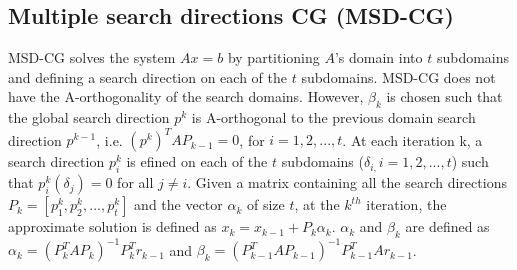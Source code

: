 \documentclass[]{scrartcl}
\begin{document}
\subsection{Multiple search directions CG (MSD-CG)}
MSD-CG solves the system $Ax=b$ by partitioning $A$'s domain into $t$ subdomains and defining a search direction on each of the $t$ subdomains. MSD-CG does not have the A-orthogonality of the search domains. However, $\beta_{k}$ is chosen such that the global search direction $p^{k}$ is A-orthogonal to the previous domain search direction $p^{k-1}$, i.e. $(p^{k})^{T}AP_{k-1}=0$, for $i=1,2, ...,t$. At each iteration k, a search direction $p_{i}^{k}$ is efined on each of the $t$ subdomains ($\delta_{i,}i=1, 2, ..., t$) such that $p_{i}^{k}(\delta_{j})=0$ for all $j\neq i$. Given a matrix containing all the search directions $P_{k}=[p_{1}^{k}, p_{2}^{k}, ..., p_{t}^{k}]$ and the vector $\alpha_{k}$ of size $t$, at the $k^{th}$ iteration, the approximate solution is defined as $x_{k}=x_{k-1}+P_{k}\alpha_{k}$. $\alpha_{k}$ and $\beta_{k}$ are defined as $\alpha_{k}=(P_{k}^{T}AP_{k})^{-1}P_{k}^{T}r_{k-1}$ and $\beta_{k}=(P_{k-1}^{T}AP_{k-1})^{-1}P_{k-1}^{T}Ar_{k-1} $.  
\end{document}
